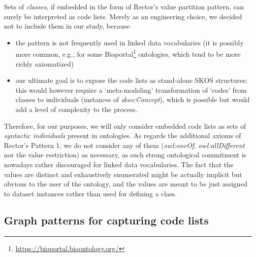 Sets of \emph{classes}, if embedded in the form of Rector's value partition pattern, can surely be interpreted as code lists.
Merely as an engineering choice, we decided not to include them in our study, because
\begin{itemize}
    \item the pattern is not frequently used in linked data vocabularies (it is possibly more common, e.g., for some Bioportal\footnote{\url{https://bioportal.bioontology.org/}} ontologies, which tend to be more richly axiomatized)
    \item our ultimate goal is to expose the code lists as stand-alone SKOS structures; this would however require a `meta-modeling' transformation of `codes' from classes to individuals (instances of \emph{skos:Concept}), which is possible but would add a level of complexity to the process.
\end{itemize}

Therefore, for our purposes, we will only consider embedded code lists as sets of \emph{syntactic individuals} present in ontologies.
As regards the additional axioms of Rector's Pattern 1, we do not consider any of them (\emph{owl:oneOf}, \emph{owl:allDifferent} nor the value restriction) as necessary, as such strong ontological commitment is nowadays rather discouraged for linked data vocabularies. 
The fact that the values are distinct and exhaustively enumerated might be actually implicit but obvious to the user of the ontology, and the values are meant to be just assigned to dataset instances rather than used for defining a class.

\subsection{Graph patterns for capturing code lists}
\label{ss:def_patt}

